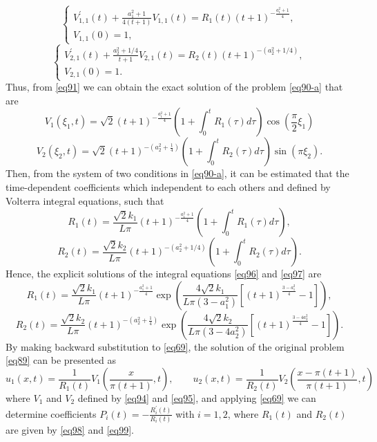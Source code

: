\documentclass[preprint,12pt,authoryear]{elsarticle}
\begin{document}
\begin{equation}\label{eq92}
    \begin{cases}
        V_{1,1}^{\prime}(t)+\frac{a_1^2+1}{4(t+1)}V_{1,1}(t)=R_1(t)(t+1)^{-\frac{a_1^2+1}{4}},\\
        V_{1,1}(0)=1,
    \end{cases}
\end{equation}
\begin{equation}\label{eq93}
    \begin{cases}
        V_{2,1}^{\prime}(t)+\frac{a_2^2+1/4}{t+1}V_{2,1}(t)=R_2(t)(t+1)^{-(a_2^2+1/4)},\\
        V_{2,1}(0)=1.
    \end{cases}
\end{equation}
Thus, from \eqref{eq91} we can obtain the exact solution of the problem \eqref{eq90-a} that are
\begin{equation}\label{eq94}
    V_{1}(\xi_1,t)=\sqrt{2}(t+1)^{-\frac{a_1^2+1}{4}}\left(1+\int_0^t R_1(\tau)d\tau\right)\cos\left(\frac{\pi}{2}\xi_1\right)
\end{equation}
\begin{equation}\label{eq95}
    V_2(\xi_2,t)=\sqrt{2}(t+1)^{-\left(a_2^2+\frac{1}{4}\right)}\left(1+\int_0^t R_2(\tau)d\tau\right)\sin(\pi\xi_2).
\end{equation}
Then, from the system of two conditions in \eqref{eq90-a}, it can be estimated that the time-dependent coefficients which independent to each others and defined by Volterra integral equations, such that
\begin{equation}\label{eq96}
    R_1(t)=\frac{\sqrt{2}k_1}{L\pi}(t+1)^{-\frac{a_1^2+1}{4}}\left(1+\int_0^t R_1(\tau)d\tau\right),
\end{equation}
\begin{equation}\label{eq97}
    R_2(t)=\frac{\sqrt{2}k_2}{L\pi}(t+1)^{-(a_2^2+1/4)}\left(1+\int_0^t R_2(\tau)d\tau\right).
\end{equation}
Hence, the explicit solutions of the integral equations \eqref{eq96} and \eqref{eq97} are
\begin{equation}\label{eq98}
    R_1(t)=\frac{\sqrt{2}k_1}{L\pi}(t+1)^{-\frac{a_1^2+1}{4}}\exp\left(\frac{4\sqrt{2}k_1}{L\pi(3-a_1^2)}\left[(t+1)^{\frac{3-a_1^2}{4}}-1\right]\right),
\end{equation}
\begin{equation}\label{eq99}
    R_2(t)=\frac{\sqrt{2}k_2}{L\pi}(t+1)^{-\left(a_2^2+\frac{1}{4}\right)}\exp\left(\frac{4\sqrt{2}k_2}{L\pi(3-4a_2^2)}\left[(t+1)^{\frac{3-4a_2^2}{4}}-1\right]\right).
\end{equation}
By making backward substitution to \eqref{eq69}, the solution of the original problem \eqref{eq89} can be presented as
\begin{equation}\label{eq98}
    u_1(x,t)=\frac{1}{R_1(t)}V_1\left(\frac{x}{\pi(t+1)},t\right),\quad\quad u_2(x,t)=\frac{1}{R_2(t)}V_2\left(\frac{x-\pi(t+1)}{\pi(t+1)},t\right)
\end{equation}
where $V_1$ and $V_2$ defined by \eqref{eq94} and \eqref{eq95}, and applying \eqref{eq69} we can determine coefficients $P_i(t)=-\frac{R_i^{\prime}(t)}{R_i(t)}$ with $i=1,2$, where $R_1(t)$ and $R_2(t)$ are given by \eqref{eq98} and \eqref{eq99}.
\end{document}
